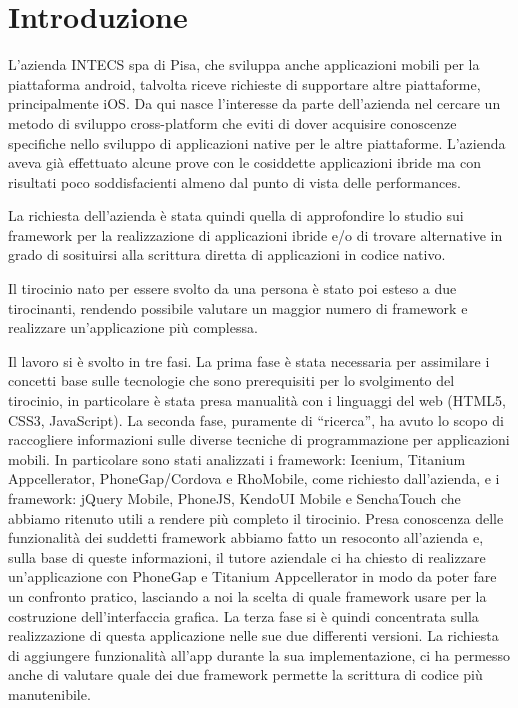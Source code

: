 \chapter{Introduzione}
	L'azienda INTECS spa di Pisa, che sviluppa anche applicazioni mobili per la 
	piattaforma android, talvolta riceve richieste di supportare altre piattaforme,
	principalmente iOS. Da qui nasce l'interesse da parte dell'azienda nel
	cercare un metodo di sviluppo cross-platform che eviti di dover acquisire 
	conoscenze specifiche nello sviluppo di applicazioni native per le altre 
	piattaforme. L'azienda aveva già effettuato alcune prove con le cosiddette
	applicazioni ibride ma con risultati poco soddisfacienti almeno dal punto di
	vista delle performances.
	
	La richiesta dell'azienda è stata quindi quella di approfondire lo studio sui
	framework per la realizzazione di applicazioni ibride e/o di trovare alternative
	in grado di sosituirsi alla scrittura diretta di applicazioni in codice 
	nativo.
	
	Il tirocinio nato per essere svolto da una persona è stato poi esteso a due
	tirocinanti, rendendo possibile valutare un maggior numero di framework e 
	realizzare un'applicazione più complessa.
	
	Il lavoro si è svolto in tre fasi. La prima fase è stata necessaria per 
	assimilare i concetti base sulle tecnologie che sono prerequisiti per lo 
	svolgimento del tirocinio, in particolare è stata presa manualità con i 
	linguaggi del web (HTML5, CSS3, JavaScript). La seconda fase, puramente di
	``ricerca'', ha avuto lo scopo di raccogliere informazioni sulle diverse 
	tecniche di programmazione per applicazioni mobili. In particolare sono 
	stati analizzati i framework: Icenium, Titanium Appcellerator, 
	PhoneGap/Cordova e RhoMobile, come richiesto dall'azienda, e i framework:
	jQuery Mobile, PhoneJS, KendoUI Mobile e SenchaTouch che abbiamo ritenuto
	utili a rendere più completo il tirocinio.
	Presa conoscenza delle funzionalità dei suddetti framework abbiamo fatto un
	resoconto all'azienda e, sulla base di queste informazioni, il tutore 
	aziendale ci ha chiesto di realizzare un'applicazione con PhoneGap e Titanium 
	Appcellerator in modo da poter fare un confronto pratico, lasciando a noi la
	scelta di quale framework usare per la costruzione dell'interfaccia grafica.
	La terza fase si è quindi concentrata sulla realizzazione di questa 
	applicazione nelle sue due differenti versioni. La richiesta di aggiungere
	funzionalità all'app durante la sua implementazione, ci ha permesso anche di 
	valutare quale dei due framework permette la scrittura di codice più 
	manutenibile.
	
